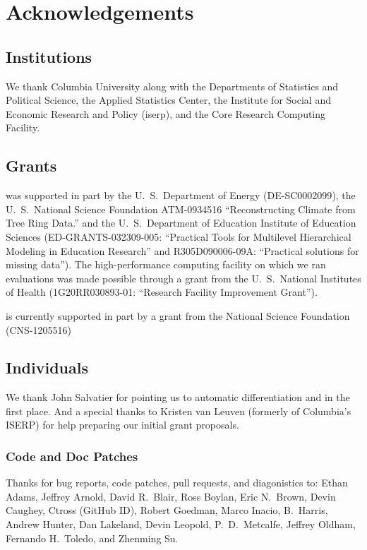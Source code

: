 \chapter*{Acknowledgements}

\section*{Institutions}

We thank Columbia University along with the Departments of
Statistics and Political Science, the Applied Statistics Center, the
Institute for Social and Economic Research and Policy ({\sc iserp}),
and the Core Research Computing Facility.

\section*{Grants}

\Stan was supported in part by 
%
the U.~S.\ Department of Energy 
({\small DE-SC0002099}), 
%
the U.~S.\ National Science Foundation 
{\small ATM-0934516}
``Reconstructing Climate from Tree Ring Data.''
and 
%
the U.~S.\ Department of Education Institute of Education Sciences 
({\small ED-GRANTS-032309-005}:
 ``Practical Tools for Multilevel Hierarchical Modeling in Education
 Research'' and
 {\small R305D090006-09A}:
 ``Practical solutions for missing data'').
%
The high-performance computing
facility on which we ran evaluations was made possible through 
a grant from the U.~S.\ National Institutes of Health 
({\small 1G20RR030893-01}:
 ``Research Facility Improvement Grant'').

\Stan is currently supported in part by a grant from the National
Science Foundation (CNS-1205516)

\section*{Individuals}

We thank John Salvatier for pointing us to automatic differentiation
and \HMC in the first place.  And a special thanks to Kristen van
Leuven (formerly of Columbia's ISERP) for help preparing our initial
grant proposals.

\subsection*{Code  and Doc Patches}

Thanks for bug reports, code patches, pull requests, and diagonistics
to: Ethan Adams, Jeffrey Arnold, David R.~Blair, Ross Boylan, Eric
N.~Brown, Devin Caughey, Ctross (GitHub ID), Robert Goedman, Marco
Inacio, B.~Harris, Andrew Hunter, Dan Lakeland, Devin Leopold,
P.~D.~Metcalfe, Jeffrey Oldham, Fernando H.~Toledo, and Zhenming Su.

